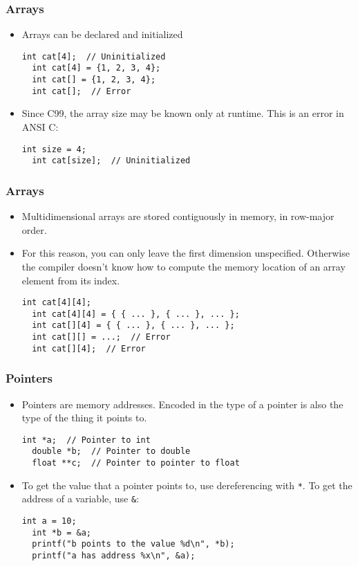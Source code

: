 \begin{frame}[fragile]
  \frametitle{Arrays}
  \begin{itemize}
  \item Arrays can be declared and initialized
\begin{lstlisting}[style=c]
  int cat[4];  // Uninitialized
  int cat[4] = {1, 2, 3, 4};
  int cat[] = {1, 2, 3, 4};
  int cat[];  // Error
\end{lstlisting}
  \item Since C99, the array size may be known only at runtime. This is an error
    in ANSI C:
\begin{lstlisting}[style=c]
  int size = 4;
  int cat[size];  // Uninitialized
\end{lstlisting}
  \end{itemize}
\end{frame}

\begin{frame}[fragile]
  \frametitle{Arrays}
  \begin{itemize}
  \item Multidimensional arrays are stored contiguously in memory, in row-major
    order.
  \item For this reason, you can only leave the first dimension unspecified.
    Otherwise the compiler doesn't know how to compute the memory location of an
    array element from its index.
\begin{lstlisting}[style=c]
  int cat[4][4];
  int cat[4][4] = { { ... }, { ... }, ... };
  int cat[][4] = { { ... }, { ... }, ... };
  int cat[][] = ...;  // Error
  int cat[][4];  // Error
\end{lstlisting}
  \end{itemize}
\end{frame}

\begin{frame}[fragile]
  \frametitle{Pointers}
  \begin{itemize}
  \item Pointers are memory addresses. Encoded in the type of a pointer is also
    the type of the thing it points to.
\begin{lstlisting}[style=c]
  int *a;  // Pointer to int
  double *b;  // Pointer to double
  float **c;  // Pointer to pointer to float
\end{lstlisting}
  \item To get the value that a pointer points to, use dereferencing with
    \texttt{*}. To get the address of a variable, use \texttt{\&}:
\begin{lstlisting}[style=c]
  int a = 10;
  int *b = &a;
  printf("b points to the value %d\n", *b);
  printf("a has address %x\n", &a);
\end{lstlisting}
  \end{itemize}
\end{frame}

